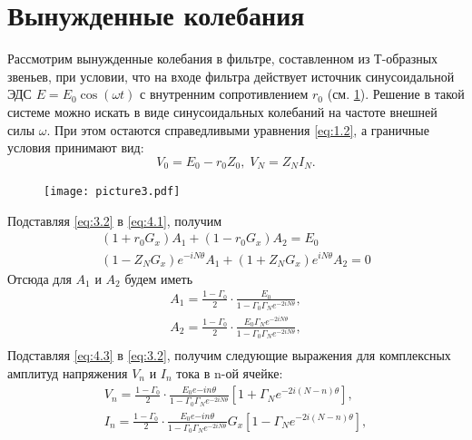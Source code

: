 \section{Вынужденные колебания}
Рассмотрим вынужденные колебания в фильтре, составленном из Т-образных звеньев, при условии, что на входе фильтра действует источник синусоидальной ЭДС $E=E_0\cos(\omega t)$ с внутренним сопротивлением $r_0$ (см. \ref{fig:3}). Решение в такой системе можно искать в виде синусоидальных колебаний на частоте внешней силы $\omega$. При этом остаются справедливыми уравнения \eqref{eq:1.2}, а граничные условия принимают вид:
\begin{equation}
	\label{eq:4.1}
	V_0=E_0-r_0Z_0,\;V_N=Z_NI_N.
\end{equation}
\begin{figure}[h!]
	\centering
	\texttt{[image: picture3.pdf]}
	\caption{}
	\label{fig:3}
\end{figure}
Подставляя \eqref{eq:3.2} в \eqref{eq:4.1}, получим 
\begin{equation}
	\label{eq:4.2}
	\begin{gathered}
	(1+r_0G_x)A_1+(1-r_0G_x)A_2=E_0\\
	(1-Z_NG_x)e^{-iN\theta}A_1+(1+Z_NG_x)e^{iN\theta}A_2=0
	\end{gathered}
\end{equation}
Отсюда для $A_1$ и $A_2$ будем иметь
\begin{equation}
	\label{eq:4.3}
	\begin{gathered}
	A_1=\frac{1-\Gamma_0}{2}\cdot\frac{E_0}{1-\Gamma_0\Gamma_Ne^{-2iN\theta}},\\
	A_2=\frac{1-\Gamma_0}{2}\cdot\frac{E_0\Gamma_Ne^{-2iN\theta}}{1-\Gamma_0\Gamma_Ne^{-2iN\theta}},\\
	\end{gathered}
\end{equation}
Подставляя \eqref{eq:4.3} в \eqref{eq:3.2}, получим следующие выражения для комплексных амплитуд напряжения $V_n$ и $I_n$ тока в n-ой ячейке:
\begin{equation}
	\label{eq:4.4}
	\begin{gathered}
	V_n=\frac{1-\Gamma_0}{2}\cdot\frac{E_0e{-in\theta}}{1-\Gamma_0\Gamma_Ne^{-2iN\theta}}\left[1+\Gamma_Ne^{-2i(N-n)\theta}\right],\\
	I_n=\frac{1-\Gamma_0}{2}\cdot\frac{E_0e{-in\theta}}{1-\Gamma_0\Gamma_Ne^{-2iN\theta}}G_x\left[1-\Gamma_Ne^{-2i(N-n)\theta}\right],\\
	\end{gathered}
\end{equation}
